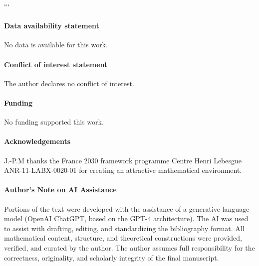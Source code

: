 \documentclass[11pt,reqno]{amsart}
\begin{document}
\vskip 12pt
```


\paragraph{\bf Data availability statement} No data is available for this work.

\vskip 12pt

\paragraph{\bf Conflict of interest statement} The author declares no conflict of interest.

\vskip 12pt

\paragraph{\bf Funding} No funding supported this work.

\vskip 12pt

\paragraph{\bf Acknowledgements} J.-P.M thanks the France 2030 framework programme Centre Henri Lebesgue ANR-11-LABX-0020-01 
for creating an attractive mathematical environment.

\vskip 12pt

\paragraph{\bf Author's Note on AI Assistance}
Portions of the text were developed with the assistance of a generative language model (OpenAI ChatGPT, based on the GPT-4 architecture). The AI was used to assist with drafting, editing, and standardizing the bibliography format. All mathematical content, structure, and theoretical constructions were provided, verified, and curated by the author. The author assumes full responsibility for the correctness, originality, and scholarly integrity of the final manuscript.
\end{document}
